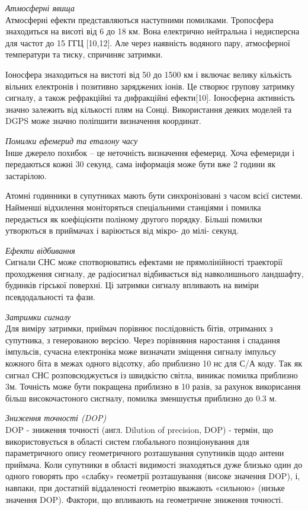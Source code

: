 \vspace{5mm}
\textit{Атмосферні явища}\\
Атмосферні ефекти представляються наступними помилками. Тропосфера знаходиться 
на висоті від 6 до 18 км. Вона електрично нейтральна і недисперсна для частот 
до 15 ГГЦ [10,12]. Але через наявність водяного пару, атмосферної температури 
та тиску, спричиняє затримки.

Іоносфера знаходиться на вистоті від 50 до 1500 км і включає велику кількість  
вільних електронів і позитивно заряджених іонів. Це створює групову затримку 
сигналу, а також рефракційні та дифракційні ефекти[10]. Іоносферна 
активність значно залежить від кількості плям на Сонці. Використання деяких 
моделей та DGPS може значно поліпшити визначення координат.

\vspace{5mm}
\textit{Помилки ефемерид та еталону часу}\\
Інше джерело похибок -- це неточність визначення ефемерид. Хоча 
ефемериди і передаються кожні 30 секунд, сама інформація може бути вже 2 
години як застарілою. 

Атомні годинники в супутниках мають бути синхронізовані з часом 
всієї системи. Найменші відхилення моніторяться спеціальними станціями і 
помилка передається як коефіцієнти поліному другого порядку. Більші помилки 
утворються в приймачах і варіюється від мікро- до мілі- секунд.

\vspace{5mm}
\textit{Ефекти відбивання}\\
Сигнали СНС може спотворюватись ефектами не прямолінійності траекторії проходження  
сигналу, де радіосигнал відбивається від навколишнього ландшафту, будинків 
гірської поверхні. Ці затримки сигналу впливають на виміри псевдодальності та фази. 

\vspace{5mm}
\textit{Затримки сигналу}\\
Для виміру затримки, приймач порівнює послідовність бітів, отриманих з супутника, 
з генерованою версією. Через порівняння наростання і спадання імпульсів, сучасна 
електроніка може визначати зміщення сигналу імпульсу кожного біта в межах одного 
відсотку, або приблизно 10 нс для С/А коду. Так як сигнал СНС розповсюджується із 
швидкістю світла, виникає помилка приблизно 3м.
Точність може бути покращена приблизно в 10 разів, за рахунок викорисання 
більш високочастоного сисгналу, помилка зменшуєтья приблизно до 0.3 м.

\vspace{5mm}
\textit{Зниження точності (DOP)}\\
DOP -  зниження точності (англ. Dilution of precision, DOP) - термін, 
що використовується в області систем глобального позиціонування для 
параметричного опису геометричного розташування супутників щодо антени 
приймача. Коли супутники в області видимості знаходяться дуже близько 
один до одного говорять про «слабку» геометрії розташування (високе значення DOP), 
і, навпаки, при достатній віддаленості геометрію вважають «сильною» (низьке значення DOP). 
Фактори, що впливають на геометричне зниження точності.

